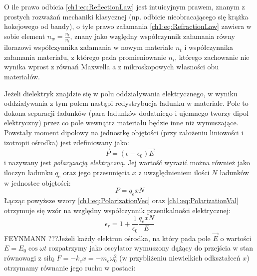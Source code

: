 O ile prawo odbicia \eqref{ch1:eq:ReflectionLaw} jest intuicyjnym prawem, znanym z prostych rozważań mechaniki klasycznej (np. odbicie nieobracającego się krążka hokejowego od bandy), o tyle prawo załamania \eqref{ch1:eq:RefractionLaw} zawiera w sobie element $n_w = \frac{n_t}{n_i}$, znany jako względny współczynnik załamania równy ilorazowi współczynnika załamania w nowym materiale $n_t$ i współczynnika załamania materiału, z którego pada promieniowanie $n_i$, którego zachowanie nie wynika wprost z równań Maxwella a z mikroskopowych własności obu materiałów. 

Jeżeli dielektryk znajdzie się w polu oddziaływania elektrycznego, w wyniku oddziaływania z tym polem nastąpi redystrybucja ładunku w materiale. Pole to dokona separacji ładunków (para ładunków dodatniego i ujemnego tworzy dipol elektryczny) przez co pole wewnątrz materiału będzie inne niż wymuszające. Powstały moment dipolowy na jednostkę objętości (przy założeniu liniowości i izotropii ośrodka) jest zdefiniowany jako:
\begin{equation}
\vec{P} = (\epsilon - \epsilon_0)\vec{E}
\label{ch1:eq:PolarizationVec}
\end{equation}
i nazywany jest \textit{polaryzacją elektryczną}. Jej wartość wyrazić można również jako iloczyn ładunku $q_e$ oraz jego przesunięcia $x$ z uwzględnieniem ilości $N$ ładunków w jednostce objętości:
\begin{equation}
P = q_exN
\label{ch1:eq:PolarizationVal}
\end{equation}
Łącząc powyższe wzory \eqref{ch1:eq:PolarizationVec} oraz \eqref{ch1:eq:PolarizationVal} otrzymuje się wzór na względny współczynnik przenikalności elektrycznej:
\begin{equation}
\epsilon_r = 1 + \frac{1}{\epsilon_0}\frac{q_exN}{E}
\label{ch1:eq:RelativeEpsilon}
\end{equation}
{\color{red}FEYNMANN ???}Jeżeli każdy elektron ośrodka, na który pada pole $\vec{E}$ o wartości $E = E_0\cos\omega t$ rozpatrzymy jako oscylator wymuszony dążący do przejścia w stan równowagi z siłą $F = -k_ex = -m_e\omega_0^2$ (w przybliżeniu niewielkich odkształceń $x$) otrzymamy równanie jego ruchu w postaci:

